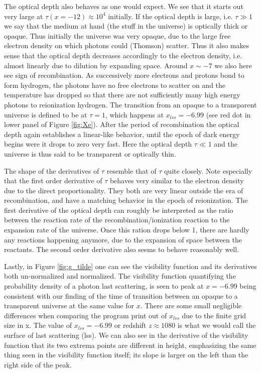 \documentclass[twocolumn]{aastex62}
\begin{document}
The optical depth also behaves as one would expect. We see that it starts out very large at $\tau(x = -12) \approx 10^4$ initially. If the optical depth is large, i.e. $\tau \gg 1$ we say that the medium at hand (the stuff in the universe) is optically thick or opaque. Thus initially the universe was very opaque, due to the large free electron density on which photons could (Thomson) scatter. Thus it also makes sense that the optical depth decreases accordingly to the electron density, i.e. almost linearly due to dilution by expanding space. Around $x\sim -7$ we also here see sign of recombination. As successively more electrons and protons bond to form hydrogen, the photons have no free electrons to scatter on and the temperature has dropped so that there are not sufficiently many high energy photons to reionization hydrogen. The transition from an opaque to a transparent universe is defined to be at $\tau = 1$, which happens at $x_{lss} = -6.99$ (see red dot in lower panel of Figure \ref{fig:Xe}). After the period of recombination the optical depth again establishes a linear-like behavior, until the epoch of dark energy begins were it drops to zero very fast. Here the optical depth $\tau \ll 1$ and the universe is thus said to be transparent or optically thin.

The shape of the derivatives of $\tau$ resemble that of $\tau$ quite closely. Note especially that the first order derivative of $\tau$ behaves very similar to the electron density due to the direct proportionality. They both are very linear outside the era of recombination, and have a matching behavior in the epoch of reionization. The first derivative of the optical depth can roughly be interpreted as the ratio between the reaction rate of the recombination/ionization reaction to the expansion rate of the universe. Once this ration drops below 1, there are hardly any reactions happening anymore, due to the expansion of space between the reactants. The second order derivative also seems to behave reasonably well.

Lastly, in Figure \ref{fig:g_tilde} one can see the visibility function and its derivatives both un-normalized and normalized. The visibility function quantifying the probability density of a photon last scattering, is seen to peak at $x = -6.99$ being consistent with our finding of the time of transition between an opaque to a transparent universe at the same value for $x$. There are some small negligible differences when comparing the program print out of $x_{lss}$ due to the finite grid size in x. The value of $x_{lss} = -6.99$ or redshift $z \approx 1080$ is what we would call the surface of last scattering (lss). We can also see in the derivative of the visibility function that its two extrema points are different in height, emphasizing the same thing seen in the visibility function itself; its slope is larger on the left than the right side of the peak. 
\end{document}
